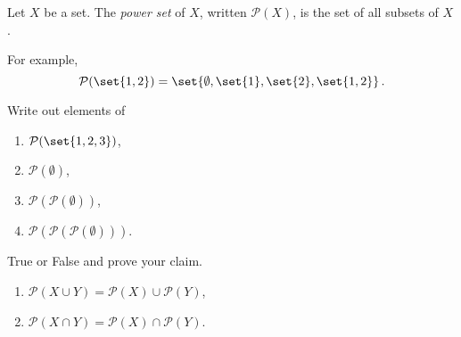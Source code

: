 \documentclass[12pt]{amsart}
\begin{document}
\begin{definition}
    Let $X$ be a set. The \emph{power set} of $X$, written $\mathcal{P}(X)$, is the set of all subsets of $X$.

    For example, $$\mathcal{P}(\set{1,2}) = \set{ \emptyset, \set{1}, \set{2}, \set{1,2}}\,.$$ 
\end{definition}

\begin{problem}
    Write out elements of
    \begin{enumerate}
        \item  $\mathcal{P}(\set{1,2,3})$,
        \item $\mathcal{P}(\emptyset)$,
        \item $\mathcal{P}(\mathcal{P}(\emptyset))$,
        \item $\mathcal{P}(\mathcal{P}(\mathcal{P}(\emptyset)))$.
    \end{enumerate}
\end{problem}

\begin{problem}
    True or False and prove your claim.
    \begin{enumerate}
        \item $\mathcal{P}(X\cup Y) = \mathcal{P}(X) \cup \mathcal{P}(Y)$,
        \item $\mathcal{P}(X\cap Y) = \mathcal{P}(X) \cap \mathcal{P}(Y)$.
    \end{enumerate}
\end{problem}
\end{document}
